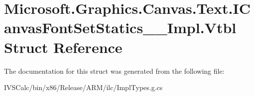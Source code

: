 \hypertarget{struct_microsoft_1_1_graphics_1_1_canvas_1_1_text_1_1_i_canvas_font_set_statics_____impl_1_1_vtbl}{}\section{Microsoft.\+Graphics.\+Canvas.\+Text.\+I\+Canvas\+Font\+Set\+Statics\+\_\+\+\_\+\+Impl.\+Vtbl Struct Reference}
\label{struct_microsoft_1_1_graphics_1_1_canvas_1_1_text_1_1_i_canvas_font_set_statics_____impl_1_1_vtbl}


The documentation for this struct was generated from the following file\+:\begin{DoxyCompactItemize}
\item 
I\+V\+S\+Calc/bin/x86/\+Release/\+A\+R\+M/ilc/Impl\+Types.\+g.\+cs\end{DoxyCompactItemize}
